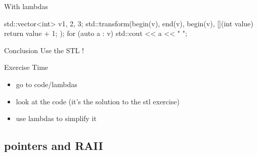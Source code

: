 \begin{frame}[fragile]
  \begin{exampleblock}{With lambdas}
    \begin{cppcode*}{}
      std::vector<int> v{1, 2, 3};
      std::transform(begin(v), end(v), begin(v),
                     [](int value) {
                       return value + 1;
                     });
      for (auto a : v) std::cout << a << " ";
    \end{cppcode*}
  \end{exampleblock}
  \pause
  \begin{alertblock}{Conclusion}
    Use the STL !
  \end{alertblock}
\end{frame}

\begin{frame}[fragile]
  \begin{alertblock}{Exercise Time}
    \begin{itemize}
    \item go to code/lambdas
    \item look at the code (it's the solution to the stl exercise)
    \item use lambdas to simplify it
    \end{itemize}
  \end{alertblock}
\end{frame}

\subsection[RAII]{pointers and RAII}

